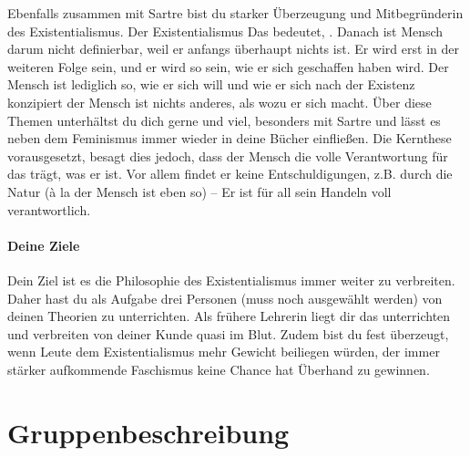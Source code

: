 \documentclass[12pt, a4paper, openany]{report}
\begin{document}
Ebenfalls zusammen mit Sartre bist du starker Überzeugung und Mitbegründerin des Existentialismus. Der Existentialismus  Das bedeutet, . Danach ist Mensch darum nicht definierbar, weil er anfangs überhaupt nichts ist. Er wird erst in der weiteren Folge sein, und er wird so sein, wie er sich geschaffen haben wird. Der Mensch ist lediglich so, wie er sich will und wie er sich nach der Existenz konzipiert der Mensch ist nichts anderes, als wozu er sich macht. Über diese Themen unterhältst du dich gerne und viel, besonders mit Sartre und lässt es neben dem Feminismus immer wieder in deine Bücher einfließen. Die Kernthese vorausgesetzt, besagt dies jedoch, dass der Mensch die volle Verantwortung für das trägt, was er ist. Vor allem findet er keine Entschuldigungen, z.B. durch die Natur (à la der Mensch ist eben so) – Er ist für all sein Handeln voll verantwortlich. 





\subsubsection{Deine Ziele}

Dein Ziel ist es die Philosophie des Existentialismus immer weiter zu verbreiten. Daher hast du als Aufgabe drei Personen (muss noch ausgewählt werden) von deinen Theorien zu unterrichten. Als frühere Lehrerin liegt dir das unterrichten und verbreiten von deiner Kunde quasi im Blut. Zudem bist du fest überzeugt, wenn Leute dem Existentialismus mehr Gewicht beiliegen würden, der immer stärker aufkommende Faschismus keine Chance hat Überhand zu gewinnen. 



\chapter{Gruppenbeschreibung}
\end{document}
